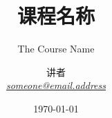 \title{课程名称}
\subtitle{The Course Name}
\date{\today}
\author{讲者{\\ \scriptsize\href{mailto:someone@email.address}{\itshape someone@email.address}}}

